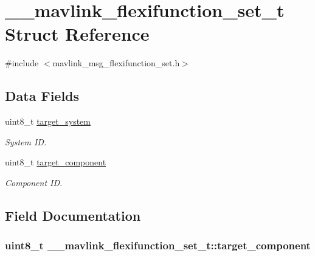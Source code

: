 \hypertarget{struct____mavlink__flexifunction__set__t}{\section{\+\_\+\+\_\+mavlink\+\_\+flexifunction\+\_\+set\+\_\+t Struct Reference}
\label{struct____mavlink__flexifunction__set__t}
}


{\ttfamily \#include $<$mavlink\+\_\+msg\+\_\+flexifunction\+\_\+set.\+h$>$}

\subsection*{Data Fields}
\begin{DoxyCompactItemize}
\item 
uint8\+\_\+t \hyperlink{struct____mavlink__flexifunction__set__t_ada52c792ba79268561b910c0eb669285}{target\+\_\+system}
\begin{DoxyCompactList}\small\item\em System I\+D. \end{DoxyCompactList}\item 
uint8\+\_\+t \hyperlink{struct____mavlink__flexifunction__set__t_a01775b772eeca49384029f32477d92d1}{target\+\_\+component}
\begin{DoxyCompactList}\small\item\em Component I\+D. \end{DoxyCompactList}\end{DoxyCompactItemize}


\subsection{Field Documentation}
\hypertarget{struct____mavlink__flexifunction__set__t_a01775b772eeca49384029f32477d92d1}{
\subsubsection[{target\+\_\+component}]{\setlength{\rightskip}{0pt plus 5cm}uint8\+\_\+t \+\_\+\+\_\+mavlink\+\_\+flexifunction\+\_\+set\+\_\+t\+::target\+\_\+component}}\label{struct____mavlink__flexifunction__set__t_a01775b772eeca49384029f32477d92d1}


